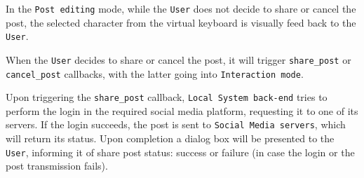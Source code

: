 In the \texttt{Post editing} mode, while the \texttt{User} does not decide to
share or cancel the post, the selected character from the virtual keyboard is
visually feed back to the \texttt{User}.

When the \texttt{User} decides to share or cancel the post, it will trigger
\texttt{share\_post} or \texttt{cancel\_post} callbacks, with the latter going
into \texttt{Interaction mode}.

Upon triggering the \texttt{share\_post} callback, \texttt{Local System
  back-end} tries to perform the login in the required social media platform,
requesting it to one of its servers. If the login succeeds, the post is sent to
\texttt{Social Media servers}, which will return its status. Upon completion a
dialog box will be presented to the \texttt{User}, informing it of share post
status: success or failure (in case the login or the post transmission fails).
%
